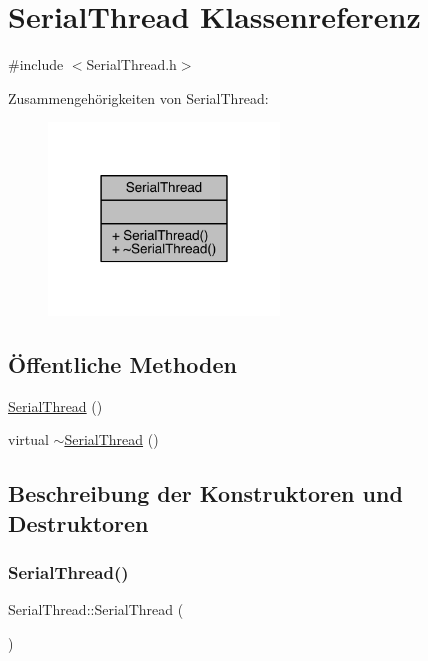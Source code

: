 \hypertarget{class_serial_thread}{}\section{Serial\+Thread Klassenreferenz}
\label{class_serial_thread}


{\ttfamily \#include $<$Serial\+Thread.\+h$>$}



Zusammengehörigkeiten von Serial\+Thread\+:\nopagebreak
\begin{figure}[H]
\begin{center}
\leavevmode
\includegraphics[width=174pt]{class_serial_thread__coll__graph}
\end{center}
\end{figure}
\subsection*{Öffentliche Methoden}
\begin{DoxyCompactItemize}
\item 
\hyperlink{class_serial_thread_a4adb81a5e8a3246f41554d72ca7062d4}{Serial\+Thread} ()
\item 
virtual \hyperlink{class_serial_thread_a14eabc004344a056196fa093189d9406}{$\sim$\+Serial\+Thread} ()
\end{DoxyCompactItemize}


\subsection{Beschreibung der Konstruktoren und Destruktoren}
\hypertarget{class_serial_thread_a4adb81a5e8a3246f41554d72ca7062d4}{}\label{class_serial_thread_a4adb81a5e8a3246f41554d72ca7062d4} 
\subsubsection{\texorpdfstring{Serial\+Thread()}{SerialThread()}}
{\footnotesize\ttfamily Serial\+Thread\+::\+Serial\+Thread (\begin{DoxyParamCaption}{ }\end{DoxyParamCaption})}

